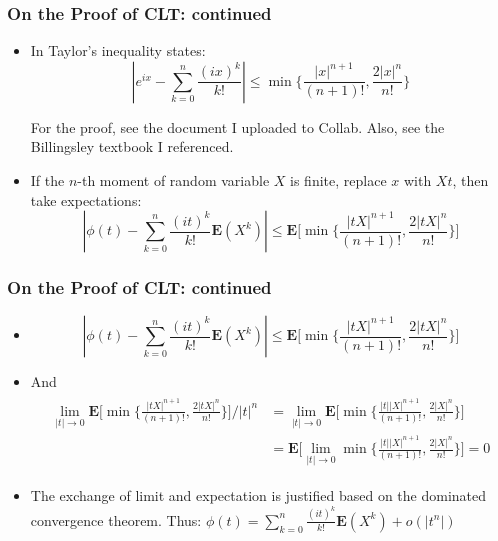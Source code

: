 \documentclass[handout]{beamer}
\newcommand{\BE}{\mathbf{E}}
\begin{document}
\frame
{
  \frametitle{On the Proof of CLT: continued}
   \begin{itemize}

\item<1->In Taylor's inequality states: 
 $$ |e^{ix}-\sum_{k=0}^n \frac{(ix)^k}{k!}| \leq \min \{ \frac{|x|^{n+1}}{(n+1)!},  \frac{2|x|^{n}}{n!} \}$$

For the proof, see the document I uploaded to Collab. Also, see the Billingsley textbook I referenced. 

\item<2-> If the $n$-th moment of random variable $X$ is finite, replace $x$ with $Xt$, then take expectations:
$$ |\phi(t) -\sum_{k=0}^n \frac{(it)^k}{k!} \BE(X^k) | \leq  \BE \big [ \min \{ \frac{|tX|^{n+1}}{(n+1)!},  \frac{2|tX|^{n}}{n!} \} \big]$$


\end{itemize}
}


\frame
{
  \frametitle{On the Proof of CLT: continued}
   \begin{itemize}


\item<1-> $$ |\phi(t) -\sum_{k=0}^n \frac{(it)^k}{k!} \BE(X^k) | \leq  \BE \big [ \min \{ \frac{|tX|^{n+1}}{(n+1)!},  \frac{2|tX|^{n}}{n!} \} \big]$$

\item<2-> And 
\begin{gather*}
\begin{align*}\lim_{|t|\rightarrow 0} \BE \big [ \min \{ \frac{|tX|^{n+1}}{(n+1)!},  \frac{2|tX|^{n}}{n!} \} \big] / |t|^n & = \lim_{|t|\rightarrow 0} \BE \big [ \min \{ \frac{|t| |X|^{n+1}}{(n+1)!},  \frac{2|X|^{n}}{n!} \} \big] \\ 
&= \BE \big [ \lim_{|t|\rightarrow 0} \min \{ \frac{|t| |X|^{n+1}}{(n+1)!},  \frac{2|X|^{n}}{n!} \} \big ]=0
\end{align*}
\end{gather*}

\item<3>[] The exchange of limit and expectation is justified based on the dominated convergence theorem. Thus:
$\phi(t)=\sum_{k=0}^n \frac{(it)^k}{k!} \BE(X^k)+o(|t^n|) $

\end{itemize}
}
\end{document}
